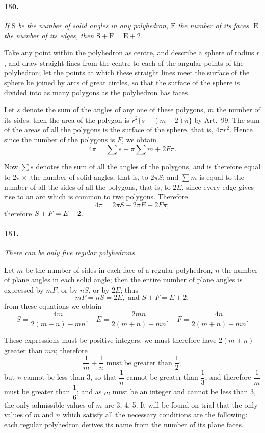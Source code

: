 \documentclass{book}[2004/02/16]
\begin{document}
\begin{mainmatter}
\begin{spacing}{1.3}
\paragraph{150.} \textit{If $\mathrm{S}$ be the number of solid angles in any polyhedron,
$\mathrm{F}$ the number of its faces, $\mathrm{E}$ the number of its edges, then
$\mathrm{S+F=E+2}$.}

Take any point within the polyhedron as centre, and describe
a sphere of radius $r$, and draw straight lines from the centre
to each of the angular points of the polyhedron; let the points
at which these straight lines meet the surface of the sphere be
joined by arcs of great circles, so that the surface of the sphere is
divided into as many polygons as the polyhedron has faces.

Let $s$ denote the sum of the angles of any one of these polygons,
$m$ the number of its sides; then the area of the polygon is
$r^2\{s-(m-2)\pi\}$ by Art.~99. The sum of the areas of all the
polygons is the surface of the sphere, that is, $4\pi r^2$. Hence since
the number of the polygons is $F$, we obtain
\[
\textstyle
4\pi = \sum s - \pi\sum m + 2F\pi.
\]

Now $\sum s$ denotes the sum of all the angles of the polygons, and
is therefore equal to $2\pi \times$ the number of solid angles, that is, to
$2\pi S$; and $\sum m$ is equal to the number of all the sides of all the
polygons, that is, to $2E$, since every edge gives rise to an arc
which is common to two polygons. Therefore
\[
4\pi = 2\pi S-2\pi E+2F\pi;
\]
therefore $\hfill
S+F=E+2.
\hfill\phantom{therefore }$

\paragraph{151.} \textit{There can be only five regular polyhedrons.}

Let $m$ be the number of sides in each face of a regular polyhedron,
$n$ the number of plane angles in each solid angle; then
the entire number of plane angles is expressed by $mF$, or by $nS$,
or by $2E$; thus
\[
  mF=nS=2E, \text{ and } S+F=E+2;
\]
from these equations we obtain
\[
  S = \frac{4 m}{2(m+n)-mn}, \quad
  E = \frac{2mn}{2(m+n)-mn}, \quad
  F = \frac{4 n}{2(m+n)-mn}.
\]

These expressions must be positive integers, we must therefore
have $2(m+n)$ greater than $mn$; therefore
\[
  \frac{1}{m}+\frac{1}{n} \text{ must be greater than } \frac{1}{2};
\]
but $n$ cannot be less than 3, so that $\dfrac{1}{n}$ cannot be greater than $\dfrac{1}{3}$,
and therefore $\dfrac{1}{m}$ must be greater than $\dfrac{1}{6}$; and as $m$ must be an
integer and cannot be less than 3, the only admissible values of $m$
are 3, 4, 5. It will be found on trial that the only values of $m$
and $n$ which satisfy all the necessary conditions are the following:
each regular polyhedron derives its name from the number of its
plane faces.


\end{spacing}
\end{mainmatter}
\end{document}
